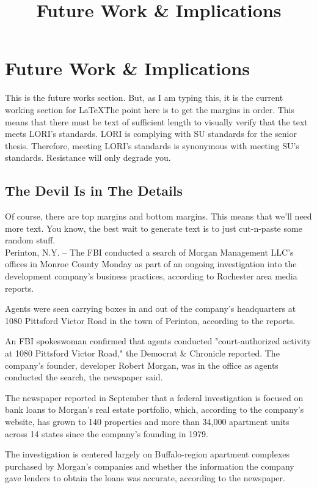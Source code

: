 \documentclass[../../main/main.tex]{subfiles}
\begin{document}
\title{Future Work \& Implications}
\chapter{Future Work \& Implications}\label{chp:future}
This is the future works section. But, as I am typing this, it is the current working section for \LaTeX\.  The point here is to get the margins in order.  This means that there must be text of sufficient length to visually verify that the text meets LORI's standards.  LORI is complying with SU standards for the senior thesis.  Therefore, meeting LORI's standards is synonymous with meeting SU's standards.  Resistance will only degrade you.

\section{The Devil Is in The Details}\label{sec:devil}
Of course, there are top margins and bottom margins.  This means that we'll need more text.  You know, the best wait to generate text is to just cut-n-paste some random stuff.\\

Perinton, N.Y. -- The FBI conducted a search of Morgan Management LLC's offices in Monroe County Monday as part of an ongoing investigation into the development company's business practices, according to Rochester area media reports.

Agents were seen carrying boxes in and out of the company's headquarters at 1080 Pittsford Victor Road in the town of Perinton, according to the reports.

An FBI spokeswoman confirmed that agents conducted "court-authorized activity at 1080 Pittsford Victor Road," the Democrat \& Chronicle reported. The company's founder, developer Robert Morgan, was in the office as agents conducted the search, the newspaper said.

The newspaper reported in September that a federal investigation is focused on bank loans to Morgan's real estate portfolio, which, according to the company's website, has grown to 140 properties and more than 34,000 apartment units across 14 states since the company's founding in 1979.

The investigation is centered largely on Buffalo-region apartment complexes purchased by Morgan's companies and whether the information the company gave lenders to obtain the loans was accurate, according to the newspaper.
\end{document}
